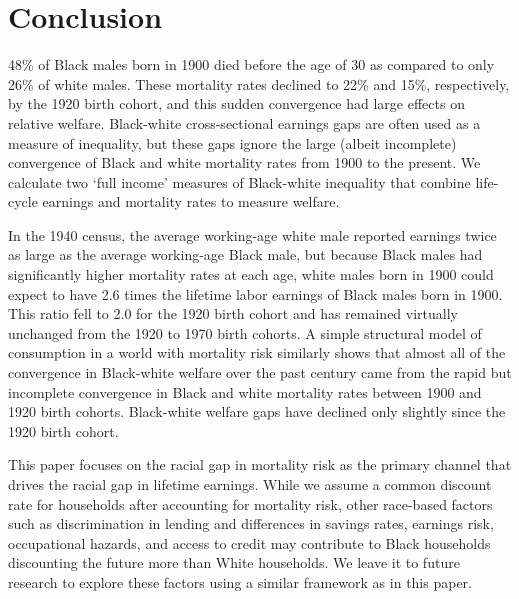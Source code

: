 \documentclass[12pt]{article}
\begin{document}

\section{Conclusion}

48\% of Black males born in 1900 died before the age of 30 as compared to only 26\% of white males. 
These mortality rates declined to 22\% and 15\%, respectively, by the 1920 birth cohort, and this sudden convergence had large effects on relative welfare. 
Black-white cross-sectional earnings gaps are often used as a measure of inequality, but these gaps ignore the large (albeit incomplete) convergence of Black and white mortality rates from 1900 to the present. 
We calculate two `full income' measures of Black-white inequality that combine life-cycle earnings and mortality rates to measure welfare.

In the 1940 census, the average working-age white male reported earnings twice as large as the average working-age Black male, but because Black males had significantly higher mortality rates at each age, white males born in 1900 could expect to have 2.6 times the lifetime labor earnings of Black males born in 1900. 
This ratio fell to 2.0 for the 1920 birth cohort and has remained virtually unchanged from the 1920 to 1970 birth cohorts. 
A simple structural model of consumption in a world with mortality risk similarly shows that almost all of the convergence in Black-white welfare over the past century came from the rapid but incomplete convergence in Black and white mortality rates between 1900 and 1920 birth cohorts. 
Black-white welfare gaps have declined only slightly since the 1920 birth cohort.

This paper focuses on the racial gap in mortality risk as the primary channel that drives the racial gap in lifetime earnings. 
While we assume a common discount rate for households after accounting for mortality risk, other race-based factors such as discrimination in lending and differences in savings rates, earnings risk, occupational hazards, and access to credit may contribute to Black households discounting the future more than White households. 
We leave it to future research to explore these factors using a similar framework as in this paper. 

\end{document}
